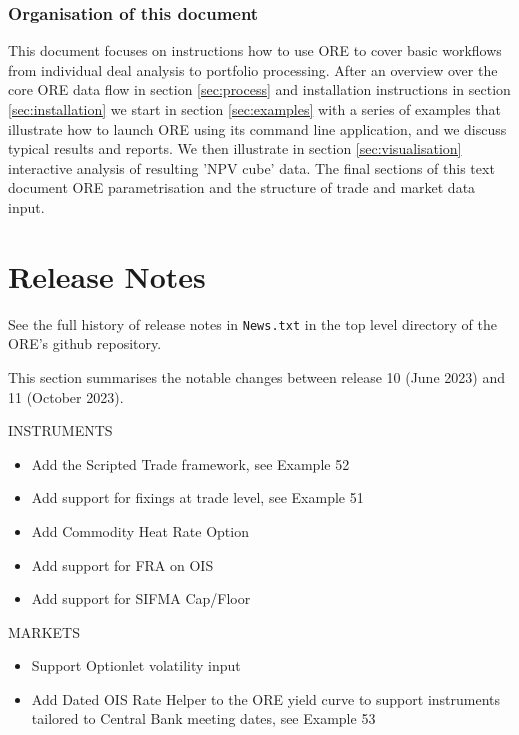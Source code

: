\documentclass[12pt, a4paper]{article}
\begin{document}
\subsubsection*{Organisation of this document}

This document focuses on instructions how to use ORE to cover basic workflows from individual deal analysis to portfolio
processing. After an overview over the core ORE data flow in section \ref{sec:process} and installation instructions in
section \ref{sec:installation} we start in section \ref{sec:examples} with a series of examples that illustrate how to
launch ORE using its command line application, and we discuss typical results and reports. We then illustrate in section
\ref{sec:visualisation} interactive analysis of resulting 'NPV cube' data. The final sections of this text document ORE
parametrisation and the structure of trade and market data input.

\section{Release Notes}\label{sec:releasenotes}

See the full history of release notes in {\tt News.txt} in the top level directory of the ORE's github repository.

\medskip
This section summarises the notable changes between release 10 (June 2023) and 11 (October 2023).

\bigskip
INSTRUMENTS
\begin{itemize}
\item Add the Scripted Trade framework, see Example 52
\item Add support for fixings at trade level, see Example 51
\item Add Commodity Heat Rate Option
\item Add support for FRA on OIS
\item Add support for SIFMA Cap/Floor
\end{itemize}

\bigskip
MARKETS
\begin{itemize}
\item Support Optionlet volatility input
\item Add Dated OIS Rate Helper to the ORE yield curve to support instruments
  tailored to Central Bank meeting dates, see Example 53
\end{itemize}
\end{document}
